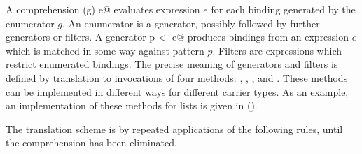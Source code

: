 \documentclass[11pt]{report}
\newcommand{\ifnewfor}[1]{}
\begin{document}
\begin{itemize}
A comprehension \verb@for (g) e@ evaluates expression $e$ for each
binding generated by the enumerator $g$. An enumerator is a generator,
possibly followed by further generators or filters.  A generator
\verb@val p <- e@ produces bindings from an expression $e$ which is
matched in some way against pattern $p$. Filters are expressions which
restrict enumerated bindings. The precise meaning of generators and
filters is defined by translation to invocations of four methods:
\verb@map@, \verb@filter@, \verb@flatMap@, and \verb@foreach@. These
methods can be implemented in different ways for different carrier
types.  As an example, an implementation of these methods for lists is
given in ().

The translation scheme is by repeated applications of the following
rules, until the comprehension has been eliminated.

\ifnewfor{
First, a definition: A pattern $P$ is a {\em binding} if $P$ is a
variable pattern or a tuple pattern consisting only of pattern
variables. In the following, we let $B$ range over bindings, $P$ over
patterns other than bindings, $E, F$ over expressions, and $G$ over
enumerators.

If
$x_1 \commadots x_n$ are the free variables of $p$, then
the generator \verb@p <- e@ is translated to:
\begin{verbatim}
$(x_1 \commadots x_n)$ <- e.filter(case p => True case _ => False).map(case p => $(x_1 \commadots x_n)$)
\end{verbatim}

A generator \verb@P <- E@ followed by a filter \verb@F@ is translated to
a single generator \verb@P <- E.filter(x_1 \commadots x_n => F)@.

The comprehension \verb@for (B <- E) E'@ is translated to
\verb@E.map(B => E')@.

The comprehension \verb@for (B <- E, G) E'@ is translated to
\begin{verbatim}
(val x$\Dollar$ = E ; x$\Dollar$.combine(for (B <- E) for (G) E'))
\end{verbatim}

}
\end{itemize}
\end{document}
